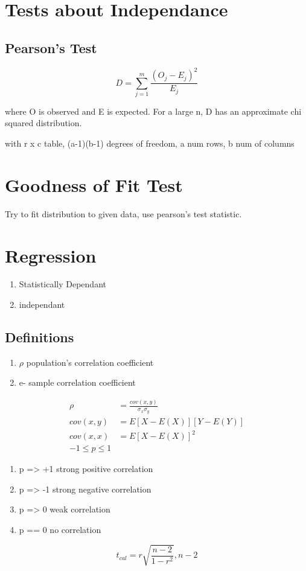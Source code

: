 \documentclass[11pt]{article}
\begin{document}
\section{Tests about Independance}
\subsection{Pearson's Test}
\begin{equation}
  D  = \sum_{j=1}^m\frac{(O_j - E_j)^2}{E_j}
\end{equation}
\par where O is observed and E is expected. For a large n, D has an approximate
chi squared distribution.
\par with r x c table, (a-1)(b-1) degrees of freedom, a num rows, b num of columns
\section{Goodness of Fit Test}
\par Try to fit distribution to given data, use pearson's test statistic.
\section{Regression}
\begin{enumerate}
  \item Statistically Dependant
  \item independant
\end{enumerate}
\subsection{Definitions}
\begin{enumerate}
  \item $\rho$ population's correlation coefficient
  \item e- sample correlation coefficient
\end{enumerate}
\begin{align*}
  \rho &= \frac{cov(x,y)}{\sigma_x\sigma_y}\\
  cov(x,y) &= E[X-E(X)][Y-E(Y)]\\
  cov(x,x) &= E[X-E(X)]^2\\
  -1\le p \le 1
\end{align*}
\begin{enumerate}
  \item p => +1 strong positive correlation
  \item p => -1 strong negative correlation
  \item p => 0 weak correlation
  \item p == 0 no correlation
\end{enumerate}
\begin{equation}
  t_{cal} = r \sqrt{\frac{n-2}{1-r^2}}, n-2
\end{equation}
\end{document}
